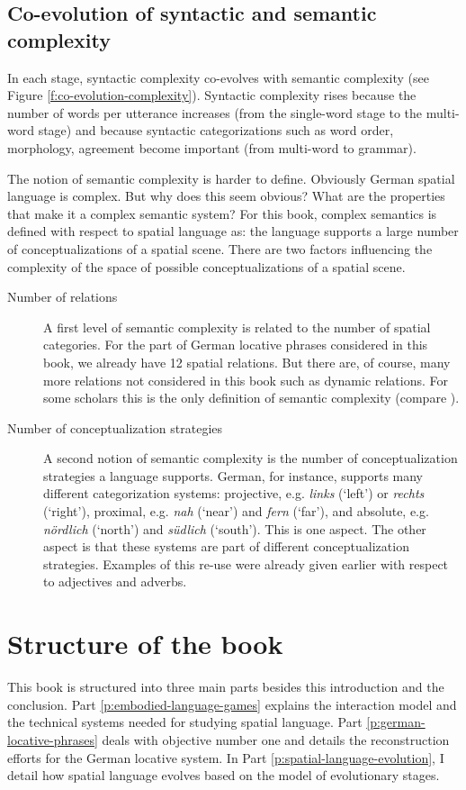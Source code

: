 \subsection{Co-evolution of syntactic and semantic complexity}
In each stage, syntactic complexity co-evolves
with semantic complexity (see Figure \ref{f:co-evolution-complexity}). 
Syntactic complexity rises because the number of words
per utterance increases (from the single-word stage to the multi-word stage) 
and because syntactic categorizations such as word order, morphology, 
agreement become important (from multi-word to grammar).

The notion of semantic complexity is harder to define. Obviously
German spatial language is complex. But why does this seem obvious? 
What are the properties that make it a complex semantic system? For this book, 
complex semantics is defined with respect to spatial language as: the language supports a large 
number of conceptualizations of a spatial scene. There are two factors influencing 
the complexity of the space of possible conceptualizations of a spatial scene.

\begin{description}
\item[Number of relations] A first level of semantic complexity
is related to the number of spatial categories. For the part
of German locative phrases considered in this book, we already have 
12 spatial relations. But there are, of course, many more relations not considered
in this book such as  dynamic relations. 
For some scholars this is the only definition of semantic complexity (compare 
\citealt{schoenemann1999syntax}).
\item[Number of conceptualization strategies]
A second notion of semantic complexity is the number of
conceptualization strategies a language supports. German, for instance, supports
many different categorization systems: projective, e.g. \textit{links} (`left') or \textit{rechts} (`right'), 
proximal, e.g. \textit{nah} (`near') and \textit{fern} (`far'), and absolute, e.g. \textit{n\"ordlich} (`north') 
and \textit{s\"udlich} (`south'). This is one aspect. The other aspect is that
these systems are part of different conceptualization strategies. 
Examples of this re-use were already given earlier with respect to adjectives and adverbs.
\end{description}

\section{Structure of the book}
\label{s:intro-structure}
This book is structured into three main parts besides this introduction 
and the conclusion. Part \ref{p:embodied-language-games} explains the interaction
model and the technical systems needed for studying spatial language.
Part \ref{p:german-locative-phrases} deals with objective number one and details the reconstruction
efforts for the German locative system. In Part \ref{p:spatial-language-evolution}, I detail how spatial
language evolves based on the model of evolutionary stages.



